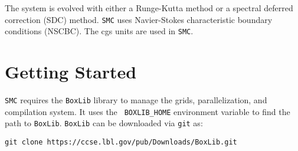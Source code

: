 \documentclass[11pt,letterpaper]{article}
\begin{document}
The system is evolved with either a Runge-Kutta method or a
spectral deferred correction (SDC) method.  {\tt SMC} uses
Navier-Stokes characteristic boundary conditions (NSCBC).  The cgs
units are used in {\tt SMC}.

\section{Getting Started}

{\tt SMC} requires the {\tt BoxLib} library to manage the grids,
parallelization, and compilation system.  It uses the {\tt
  BOXLIB\_HOME} environment variable to find the path to {\tt BoxLib}.
{\tt BoxLib} can be downloaded via {\tt git} as: \vspace{5pt}

\verb|git clone https://ccse.lbl.gov/pub/Downloads/BoxLib.git|\\
\end{document}
